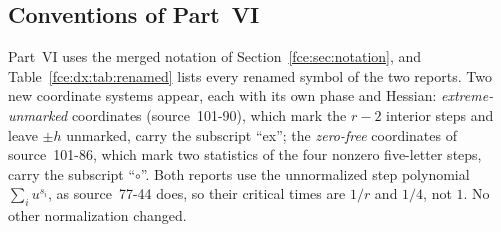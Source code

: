 \documentclass[11pt,a4paper]{article}
\numberwithin{equation}{section}
\theoremstyle{definition}\newtheorem{definition}[theorem]{Definition}
\theoremstyle{remark}\newtheorem{remark}[theorem]{Remark}
\begin{document}
\subsection{Conventions of Part~VI}\label{fce:dx:sec:conventions}
Part~VI uses the merged notation of Section~\ref{fce:sec:notation}, and
Table~\ref{fce:dx:tab:renamed} lists every renamed symbol of the two reports.
Two new coordinate systems appear, each with its own phase and Hessian:
\emph{extreme-unmarked} coordinates (source~101-90), which mark the $r-2$
interior steps and leave $\pm h$ unmarked, carry the subscript ``ex''; the
\emph{zero-free} coordinates of source~101-86, which mark two statistics of
the four nonzero five-letter steps, carry the subscript ``$\circ$''. Both
reports use the unnormalized step polynomial $\sum_iu^{s_i}$, as source~77-44
does, so their critical times are $1/r$ and $1/4$, not $1$. No other
normalization changed.
\end{document}
